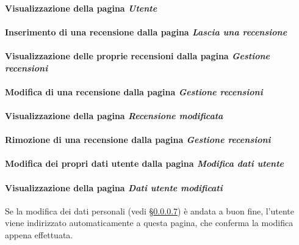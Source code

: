 \paragraph{Visualizzazione della pagina \textit{Utente}}
\label{analisi-casi-uso-attori-principali-utente-autenticato-2}

\paragraph{Inserimento di una recensione dalla pagina \textit{Lascia una recensione}}
\label{analisi-casi-uso-attori-principali-utente-autenticato-3}

\paragraph{Visualizzazione delle proprie recensioni dalla pagina \textit{Gestione recensioni}}
\label{analisi-casi-uso-attori-principali-utente-autenticato-4}

\paragraph{Modifica di una recensione dalla pagina \textit{Gestione recensioni}}
\label{analisi-casi-uso-attori-principali-utente-autenticato-5}

\paragraph{Visualizzazione della pagina \textit{Recensione modificata}}
\label{analisi-casi-uso-attori-principali-utente-autenticato-6}

\paragraph{Rimozione di una recensione dalla pagina \textit{Gestione recensioni}}
\label{analisi-casi-uso-attori-principali-utente-autenticato-7}

\paragraph{Modifica dei propri dati utente dalla pagina \textit{Modifica dati utente}}
\label{analisi-casi-uso-attori-principali-utente-autenticato-8}

\paragraph{Visualizzazione della pagina \textit{Dati utente modificati}}
\label{analisi-casi-uso-attori-principali-utente-autenticato-9}
Se la modifica dei dati personali (vedi §\ref{analisi-casi-uso-attori-principali-utente-autenticato-8}) è andata a buon fine, l'utente viene indirizzato automaticamente a questa pagina, che conferma la modifica appena effettuata.

